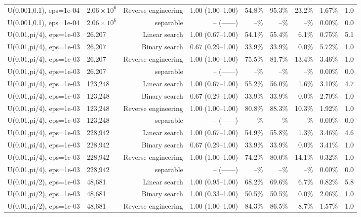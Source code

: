\begin{tabular}{llrrrrrrr}
U(0.001,0.1), eps=1e-04 & $2.06\times 10^{6}$ & Reverse engineering & 1.00 (1.00--1.00) & 54.8\% & 95.3\% & 23.2\% & 1.67\% & 1.0 \\
U(0.001,0.1), eps=1e-04 & $2.06\times 10^{6}$ & separable & -- (------) & --\% & --\% & --\% & 0.00\% & 0.0 \\
U(0.01,pi/4), eps=1e-03 & 26,207 & Linear search & 1.00 (0.67--1.00) & 54.1\% & 55.4\% & 6.1\% & 0.75\% & 5.1 \\
U(0.01,pi/4), eps=1e-03 & 26,207 & Binary search & 0.67 (0.29--1.00) & 33.9\% & 33.9\% & 0.0\% & 5.72\% & 1.0 \\
U(0.01,pi/4), eps=1e-03 & 26,207 & Reverse engineering & 1.00 (1.00--1.00) & 75.5\% & 81.7\% & 13.4\% & 3.46\% & 1.0 \\
U(0.01,pi/4), eps=1e-03 & 26,207 & separable & -- (------) & --\% & --\% & --\% & 0.00\% & 0.0 \\
U(0.01,pi/4), eps=1e-03 & 123,248 & Linear search & 1.00 (0.67--1.00) & 55.2\% & 56.0\% & 1.6\% & 3.10\% & 4.7 \\
U(0.01,pi/4), eps=1e-03 & 123,248 & Binary search & 0.67 (0.29--1.00) & 33.9\% & 33.9\% & 0.0\% & 2.70\% & 1.0 \\
U(0.01,pi/4), eps=1e-03 & 123,248 & Reverse engineering & 1.00 (1.00--1.00) & 80.8\% & 88.3\% & 10.3\% & 1.92\% & 1.0 \\
U(0.01,pi/4), eps=1e-03 & 123,248 & separable & -- (------) & --\% & --\% & --\% & 0.00\% & 0.0 \\
U(0.01,pi/4), eps=1e-03 & 228,942 & Linear search & 1.00 (0.67--1.00) & 54.9\% & 55.8\% & 1.3\% & 3.46\% & 4.6 \\
U(0.01,pi/4), eps=1e-03 & 228,942 & Binary search & 0.67 (0.29--1.00) & 33.9\% & 33.9\% & 0.0\% & 3.41\% & 1.0 \\
U(0.01,pi/4), eps=1e-03 & 228,942 & Reverse engineering & 1.00 (1.00--1.00) & 74.2\% & 80.0\% & 14.1\% & 0.32\% & 1.0 \\
U(0.01,pi/4), eps=1e-03 & 228,942 & separable & -- (------) & --\% & --\% & --\% & 0.00\% & 0.0 \\
U(0.01,pi/2), eps=1e-03 & 48,681 & Linear search & 1.00 (0.95--1.00) & 68.2\% & 69.6\% & 6.7\% & 0.82\% & 5.8 \\
U(0.01,pi/2), eps=1e-03 & 48,681 & Binary search & 1.00 (0.33--1.00) & 50.5\% & 50.5\% & 0.0\% & 2.06\% & 1.0 \\
U(0.01,pi/2), eps=1e-03 & 48,681 & Reverse engineering & 1.00 (1.00--1.00) & 84.3\% & 86.5\% & 8.7\% & 1.57\% & 1.0 \\

\end{tabular}
